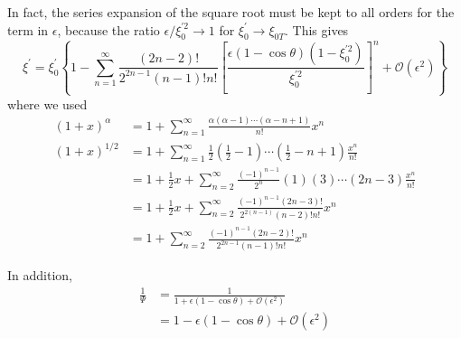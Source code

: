 In fact, the series expansion of the square root must be kept to all orders
for the term in $\epsilon$, because the ratio $\epsilon/\xi_{0}^{\prime
2}\rightarrow1$ for $\xi_{0}^{\prime}\rightarrow\xi_{0T}$. This gives%
\[
\xi^{\prime}=\xi_{0}^{\prime}\left\{  1-\sum_{n=1}^{\infty}\frac{\left(
2n-2\right)  !}{2^{2n-1}\left(  n-1\right)  !n!}\left[  \frac{\epsilon\left(
1-\cos\theta\right)  \left(  1-\xi_{0}^{\prime2}\right)  }{\xi_{0}^{\prime2}%
}\right]  ^{n}+\mathcal{O}\left(  \epsilon^{2}\right)  \right\}
\]
where we used%
\begin{align}
\left(  1+x\right)  ^{\alpha}  &  =1+\sum_{n=1}^{\infty}\frac{\alpha\left(
\alpha-1\right)  \cdots\left(  \alpha-n+1\right)  }{n!}x^{n}\\
\left(  1+x\right)  ^{1/2}  &  =1+\sum_{n=1}^{\infty}\frac{1}{2}\left(
\frac{1}{2}-1\right)  \cdots\left(  \frac{1}{2}-n+1\right)  \frac{x^{n}}{n!}\\
&  =1+\frac{1}{2}x+\sum_{n=2}^{\infty}\frac{\left(  -1\right)  ^{n-1}}{2^{n}%
}\left(  1\right)  \left(  3\right)  \cdots\left(  2n-3\right)  \frac{x^{n}%
}{n!}\\
&  =1+\frac{1}{2}x+\sum_{n=2}^{\infty}\frac{\left(  -1\right)  ^{n-1}\left(
2n-3\right)  !}{2^{2\left(  n-1\right)  }\left(  n-2\right)  !n!}x^{n}\\
&  =1+\sum_{n=2}^{\infty}\frac{\left(  -1\right)  ^{n-1}\left(  2n-2\right)
!}{2^{2n-1}\left(  n-1\right)  !n!}x^{n}%
\end{align}

In addition,%
\begin{align}
\frac{1}{\Psi}  &  =\frac{1}{1+\epsilon\left(  1-\cos\theta\right)
+\mathcal{O}\left(  \epsilon^{2}\right)  }\nonumber\\
&  =1-\epsilon\left(  1-\cos\theta\right)  +\mathcal{O}\left(  \epsilon
^{2}\right)
\end{align}

